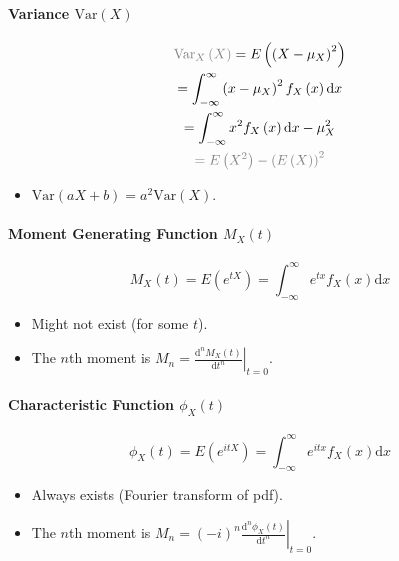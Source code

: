\documentclass[twocolumn,english]{article}
\begin{document}
\paragraph{Variance $\text{Var}\left(X\right)$}

\begin{multline*}
{\color{red}\text{Var}_{X}\left(X\right)}=E\left(\left(X-\mu_{X}\right)^{2}\right)\\
=\int_{-\infty}^{\infty}\left(x-\mu_{X}\right)^{2}f_{X}\left(x\right)\text{d}x\\
=\int_{-\infty}^{\infty}x^{2}f_{X}\left(x\right)\text{d}x-\mu_{X}^{2}\\
{\color{red}=E\left(X^{2}\right)-\left(E\left(X\right)\right)^{2}}
\end{multline*}

\begin{itemize}
\item $\text{Var}\left(aX+b\right)=a^{2}\text{Var}\left(X\right)$. 
\end{itemize}

\paragraph{Moment Generating Function $M_{X}\left(t\right)$}

\[
M_{X}\left(t\right)=E\left(e^{tX}\right)=\int_{-\infty}^{\infty}e^{tx}f_{X}\left(x\right)\text{d}x
\]

\begin{itemize}
\item Might not exist (for some $t$). 
\item The $n$th moment is $\left.M_{n}=\frac{\text{d}^{n}M_{X}\left(t\right)}{\text{d}t^{n}}\right\vert _{t=0}$. 
\end{itemize}

\paragraph{Characteristic Function $\phi_{X}\left(t\right)$}

\[
\phi_{X}\left(t\right)=E\left(e^{itX}\right)=\int_{-\infty}^{\infty}e^{itx}f_{X}\left(x\right)\text{d}x
\]

\begin{itemize}
\item Always exists (Fourier transform of pdf). 
\item The $n$th moment is $\left.M_{n}=\left(-i\right)^{n}\frac{\text{d}^{n}\phi_{X}\left(t\right)}{\text{d}t^{n}}\right\vert _{t=0}$. 
\end{itemize}
\end{document}
